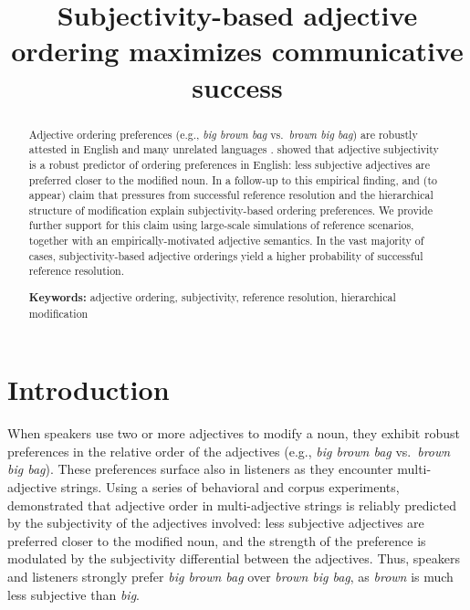 \documentclass[10pt,a4paper]{article}
\title{Subjectivity-based adjective ordering maximizes communicative success}
\begin{document}
\maketitle

\begin{abstract}
Adjective ordering preferences (e.g., \emph{big brown bag} vs.~\emph{brown big bag}) are robustly attested in English and many unrelated languages \cite{dixon1982}.  showed that adjective subjectivity is a robust predictor of ordering preferences in English: less subjective adjectives are preferred closer to the modified noun. In a follow-up to this empirical finding,  and \citeauthor{scontrasetalSPadjectives} (to appear) claim that pressures from successful reference resolution and the hierarchical structure of modification explain subjectivity-based ordering preferences. We provide further support for this claim using large-scale simulations of reference scenarios, together with an empirically-motivated adjective semantics. In the vast majority of cases, subjectivity-based adjective orderings yield a higher probability of successful reference resolution.


\textbf{Keywords:} 
adjective ordering, subjectivity, reference resolution, hierarchical modification

\end{abstract}

\section{Introduction}

When speakers use two or more adjectives to modify a noun, they exhibit robust preferences in the relative order of the adjectives (e.g., \emph{big brown bag} vs.~\emph{brown big bag}). These preferences surface also in listeners as they encounter multi-adjective strings. Using a series of behavioral and corpus experiments,  demonstrated that adjective order in multi-adjective strings is reliably predicted by the subjectivity of the adjectives involved: less subjective adjectives are preferred closer to the modified noun, and the strength of the preference is modulated by the subjectivity differential between the adjectives. Thus, speakers and listeners strongly prefer \emph{big brown bag} over \emph{brown big bag}, as \emph{brown} is much less subjective than \emph{big}.
\end{document}
